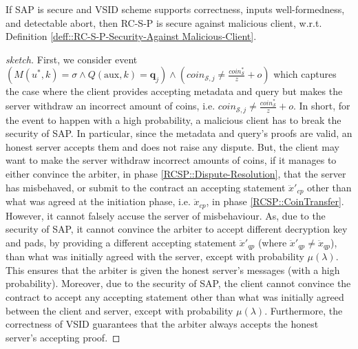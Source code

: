 \begin{lemma}
 If SAP is secure and  VSID scheme supports correctness, inputs well-formedness, and detectable abort, then RC-S-P is secure against malicious client, w.r.t. Definition \ref{deff::RC-S-P-Security-Against Malicious-Client}. 
\end{lemma}


\begin{proof}[sketch]
  First, we consider event  $(M(u^{\scriptscriptstyle *},k)= \sigma  \wedge Q(\text{aux},k)= \bm{q}_{\scriptscriptstyle j}) \wedge
  (coin_{\scriptscriptstyle\mathcal{S},j}\neq  \frac{coin_{\scriptscriptstyle\mathcal S}^{\scriptscriptstyle*}}{z}+o)$ which captures the case where the client provides  accepting metadata and query  but makes the server withdraw an incorrect amount of coins, i.e. $coin_{\scriptscriptstyle\mathcal{S},j}\neq  \frac{coin_{\scriptscriptstyle\mathcal S}^{\scriptscriptstyle*}}{z}+o$. In short, for the event to  happen with a high probability, a malicious client has to break the security of SAP. In particular, since the metadata and query's proofs are valid, an honest server accepts them and does not raise any dispute.  But, the client may want to  make the server  withdraw incorrect amounts of coins, if it manages to either convince the arbiter, in phase \ref{RCSP::Dispute-Resolution}, that the server has misbehaved, or submit to the contract  an accepting  statement $\ddot{x}'_{\scriptscriptstyle cp}$ other than what was agreed at the initiation phase, i.e. $\ddot{x}_{\scriptscriptstyle cp}$, in phase \ref{RCSP::CoinTransfer}. However, it cannot falsely accuse the server of misbehaviour. As,  due to the security of SAP, it cannot  convince the arbiter to accept different decryption key and pads, by providing a different accepting statement $\ddot{x}'_{\scriptscriptstyle qp}$  (where $\ddot{x}'_{\scriptscriptstyle qp}\neq \ddot{x}_{\scriptscriptstyle qp}$), than what was initially agreed with the server, except with  probability $\mu(\lambda)$. This ensures that  the arbiter is given the honest server's messages (with a high probability). Moreover,  due to the security of SAP, the client cannot convince the contract to accept any accepting statement other than what was initially agreed  between the client and server, except with   probability $\mu(\lambda)$. Furthermore,   the correctness of VSID guarantees that  the arbiter always accepts the honest server's accepting proof. 
  

\end{proof}
